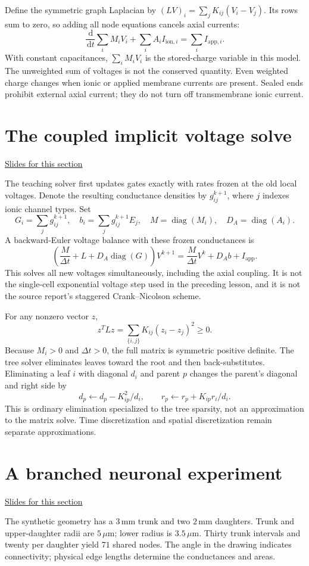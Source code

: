 \documentclass[11pt,letterpaper]{article}
\providecommand{\dd}{\,\mathrm{d}}\providecommand{\R}{\mathbb{R}}
\theoremstyle{definition}\newtheorem{definition}{Definition}\newtheorem{example}{Example}
\numberwithin{equation}{section}
\begin{document}
Define the symmetric graph Laplacian by $(LV)_i=\sum_jK_{ij}(V_i-V_j)$. Its rows sum to zero, so adding all node equations cancels axial currents:
\[
\frac{\dd}{\dd t}\sum_iM_iV_i+\sum_iA_iI_{\mathrm{ion},i}
=\sum_iI_{\mathrm{app},i}.
\]
With constant capacitances, $\sum_iM_iV_i$ is the stored-charge variable in this model. The unweighted sum of voltages is not the conserved quantity. Even weighted charge changes when ionic or applied membrane currents are present. Sealed ends prohibit external axial current; they do not turn off transmembrane ionic current.
\section{The coupled implicit voltage solve}
\hypertarget{note-the-coupled-implicit-voltage-solve}{}\label{note:the-coupled-implicit-voltage-solve}
{\small \href{slides.html\#frame=the-graph-laplacian\&step=1}{Slides for this section}}\par
The teaching solver first updates gates exactly with rates frozen at the old local voltages. Denote the resulting conductance densities by $g_{ij}^{k+1}$, where $j$ indexes ionic channel types. Set
\[
G_i=\sum_jg_{ij}^{k+1},\quad b_i=\sum_jg_{ij}^{k+1}E_j,\quad
M=\operatorname{diag}(M_i),\quad D_A=\operatorname{diag}(A_i).
\]
A backward-Euler voltage balance with these frozen conductances is
\[
\left(\frac M{\Delta t}+L+D_A\operatorname{diag}(G)\right)V^{k+1}
=\frac M{\Delta t}V^k+D_Ab+I_{\mathrm{app}}.
\]
This solves all new voltages simultaneously, including the axial coupling. It is not the single-cell exponential voltage step used in the preceding lesson, and it is not the source report's staggered Crank--Nicolson scheme.

For any nonzero vector $z$,
\[
z^TLz=\sum_{\{i,j\}}K_{ij}(z_i-z_j)^2\geq0.
\]
Because $M_i>0$ and $\Delta t>0$, the full matrix is symmetric positive definite. The tree solver eliminates leaves toward the root and then back-substitutes. Eliminating a leaf $i$ with diagonal $d_i$ and parent $p$ changes the parent's diagonal and right side by
\[
d_p\leftarrow d_p-K_{ip}^2/d_i,\qquad
r_p\leftarrow r_p+K_{ip}r_i/d_i.
\]
This is ordinary elimination specialized to the tree sparsity, not an approximation to the matrix solve. Time discretization and spatial discretization remain separate approximations.
\section{A branched neuronal experiment}
\hypertarget{note-a-branched-neuronal-experiment}{}\label{note:a-branched-neuronal-experiment}
{\small \href{slides.html\#frame=the-synthetic-branched-experiment-figure\&step=1}{Slides for this section}}\par
The synthetic geometry has a $3\,\mathrm{mm}$ trunk and two $2\,\mathrm{mm}$ daughters. Trunk and upper-daughter radii are $5\,\mu\mathrm m$; lower radius is $3.5\,\mu\mathrm m$. Thirty trunk intervals and twenty per daughter yield $71$ shared nodes. The angle in the drawing indicates connectivity; physical edge lengths determine the conductances and areas.
\end{document}

